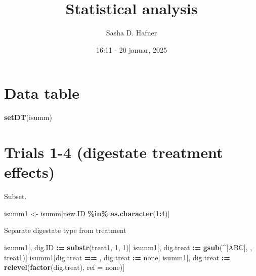 \documentclass[
]{article}
\title{Statistical analysis}
\author{Sasha D. Hafner}
\date{16:11 - 20 januar, 2025}
\newenvironment{Shaded}{\begin{snugshade}}{\end{snugshade}}
\newcommand{\AttributeTok}[1]{\textcolor[rgb]{0.13,0.29,0.53}{#1}}
\newcommand{\DecValTok}[1]{\textcolor[rgb]{0.00,0.00,0.81}{#1}}
\newcommand{\FunctionTok}[1]{\textcolor[rgb]{0.13,0.29,0.53}{\textbf{#1}}}
\newcommand{\NormalTok}[1]{#1}
\newcommand{\OtherTok}[1]{\textcolor[rgb]{0.56,0.35,0.01}{#1}}
\newcommand{\SpecialCharTok}[1]{\textcolor[rgb]{0.81,0.36,0.00}{\textbf{#1}}}
\newcommand{\StringTok}[1]{\textcolor[rgb]{0.31,0.60,0.02}{#1}}
\begin{document}
\maketitle

\section{Data table}\label{data-table}

\begin{Shaded}
\begin{Highlighting}[]
\FunctionTok{setDT}\NormalTok{(isumm)}
\end{Highlighting}
\end{Shaded}

\section{Trials 1-4 (digestate treatment
effects)}\label{trials-1-4-digestate-treatment-effects}

Subset.

\begin{Shaded}
\begin{Highlighting}[]
\NormalTok{isumm1 }\OtherTok{\textless{}{-}}\NormalTok{ isumm[new.ID }\SpecialCharTok{\%in\%} \FunctionTok{as.character}\NormalTok{(}\DecValTok{1}\SpecialCharTok{:}\DecValTok{4}\NormalTok{)]}
\end{Highlighting}
\end{Shaded}

Separate digestate type from treatment

\begin{Shaded}
\begin{Highlighting}[]
\NormalTok{isumm1[, dig.ID }\SpecialCharTok{:=} \FunctionTok{substr}\NormalTok{(treat1, }\DecValTok{1}\NormalTok{, }\DecValTok{1}\NormalTok{)]}
\NormalTok{isumm1[, dig.treat }\SpecialCharTok{:=} \FunctionTok{gsub}\NormalTok{(}\StringTok{\textquotesingle{}\^{}[ABC]\textquotesingle{}}\NormalTok{, }\StringTok{\textquotesingle{}\textquotesingle{}}\NormalTok{, treat1)]}
\NormalTok{isumm1[dig.treat }\SpecialCharTok{==} \StringTok{\textquotesingle{}\textquotesingle{}}\NormalTok{, dig.treat }\SpecialCharTok{:=} \StringTok{\textquotesingle{}none\textquotesingle{}}\NormalTok{]}
\NormalTok{isumm1[, dig.treat }\SpecialCharTok{:=} \FunctionTok{relevel}\NormalTok{(}\FunctionTok{factor}\NormalTok{(dig.treat), }\AttributeTok{ref =} \StringTok{\textquotesingle{}none\textquotesingle{}}\NormalTok{)]}
\end{Highlighting}
\end{Shaded}
\end{document}
